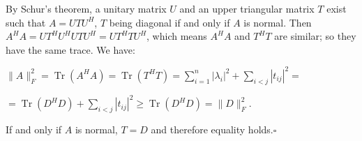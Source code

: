\documentclass[12pt]{article}
\begin{document}
By Schur's theorem, a unitary matrix $U$ and an upper triangular matrix $T$ exist such that $A=UTU^H$, $T$ being diagonal if and only if $A$ is normal.
Then $A^HA=UT^HU^HUTU^H=UT^HTU^H$, which means $A^HA$ and $T^HT$ are similar; so they have the same trace. We have:

$\|A\|_F^2=\operatorname{Tr}(A^HA)=\operatorname{Tr}(T^HT)=\sum_{i=1}^n\left|\lambda_i\right|^2+\sum_{i<j}\left|t_{ij}\right|^2=$

$=\operatorname{Tr}(D^HD)+\sum_{i<j}\left|t_{ij}\right|^2\geq\operatorname{Tr}(D^HD)=\|D\|_F^2.$

If and only if $A$ is normal, $T=D$ and therefore equality holds.$\square$
\end{document}
